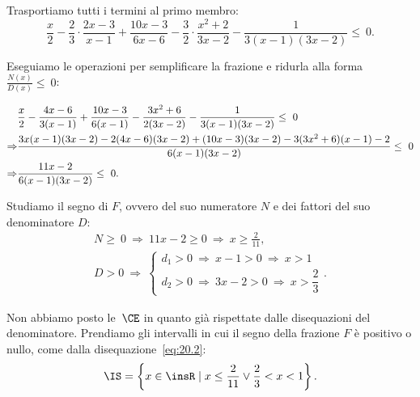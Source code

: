 \begin{exrig}
\begin{esempio}
Trasportiamo tutti i termini al primo membro:
\[\frac{x}{2}-\frac{2}{3}\cdot\frac{2x-3}{x-1}+\frac{10x-3}{6x-6}-\frac{3}{2}\cdot\frac{x^{2}+2}{3x-2}-\frac{1}{3(x-1)(3x-2)}\le~0.\]

Eseguiamo le operazioni per semplificare la frazione e ridurla alla
forma~$\frac{N(x)}{D(x)}\le~0$:

\begin{align}
  &\frac{x}{2}-\frac{4x-6}{3(x-1)}+\frac{10x-3}{6(x-1)}-\frac{3x^{2}+6}{2(3x-2)}-\frac{1}{3(x-1)(3x-2)}\le~0\notag\\
  \Rightarrow &\frac{3x(x-1)(3x-2)-2(4x-6)(3x-2)+(10x-3)(3x-2)-3(3x^{2}+6)(x-1)-2}{6(x-1)(3x-2)}\le~0\notag\\
  \Rightarrow &\frac{11x-2}{6(x-1)(3x-2)}\le~0. \label{eq:20.2}
\end{align}

Studiamo il segno di $F$, ovvero del suo numeratore $N$ e dei fattori del suo denominatore $D$:
 \[\begin{gathered}N\ge~0\:\Rightarrow\: 11x-2\ge 0\:\Rightarrow\: x\ge\frac{2}{11}\text{,}\\
		  D>0\:\Rightarrow\:\left\{\begin{array}{l}
			d_{1}>0\:\Rightarrow\: x-1>0\:\Rightarrow\: x>1\\
			d_{2}>0\:\Rightarrow\: 3x-2>0\:\Rightarrow\: x>\dfrac{2}{3}
			\end{array}\right.. \end{gathered}\]
\begin{center}

\end{center}
\pagebreak
Non abbiamo posto le~$\CE$ in quanto già rispettate dalle disequazioni
del denominatore. Prendiamo gli intervalli in cui il segno della frazione $F$ è positivo o
nullo, come dalla disequazione~\ref{eq:20.2}:
\[\IS=\left\{x\in \insR\mid x\le\frac{2}{11}\vee \frac{2}{3}<x<1\right\}.\]
 \end{esempio}
\end{exrig}
\ovalbox{\risolvii \ref{ese:20.54}, \ref{ese:20.55}, \ref{ese:20.56}, \ref{ese:20.57}, \ref{ese:20.58}, \ref{ese:20.59}, \ref{ese:20.60}, \ref{ese:20.61}, \ref{ese:20.62}, \ref{ese:20.63}}

\vspazio\ovalbox{\ref{ese:20.64}, \ref{ese:20.65}, \ref{ese:20.66}, \ref{ese:20.67}, \ref{ese:20.68}, \ref{ese:20.69}}
\newpage

\cleardoublepage
